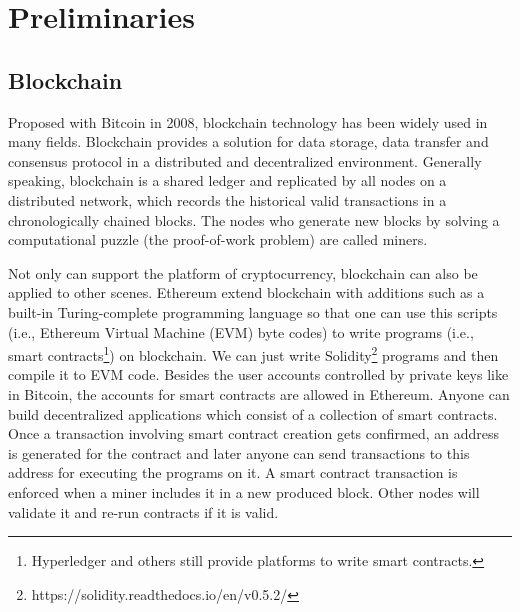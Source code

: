 \documentclass[conference]{IEEEtran}
\begin{document}
\section{Preliminaries}
\label{preli}

	\subsection{Blockchain}
	Proposed with Bitcoin \cite{nakamoto2008bitcoin} in 2008, blockchain technology has been widely used in many fields. Blockchain provides a solution for data storage, data transfer and consensus protocol in a distributed and decentralized environment. Generally speaking, blockchain is a shared ledger and replicated by all nodes on a distributed network, which records the historical valid transactions in a chronologically chained blocks. The nodes who generate new blocks by solving a computational puzzle (the proof-of-work problem) are called miners.
	
	Not only can support the platform of cryptocurrency, blockchain can also be applied to other scenes. Ethereum \cite{wood2014ethereum} extend blockchain with additions such as a built-in Turing-complete programming language so that one can use this scripts (i.e., Ethereum Virtual Machine (EVM) byte codes) to write programs (i.e., smart contracts\footnote{Hyperledger and others still provide platforms to write smart contracts.}) on blockchain. We can just write Solidity\footnote{https://solidity.readthedocs.io/en/v0.5.2/} programs and then compile it to EVM code. Besides the user accounts controlled by private keys like in Bitcoin, the accounts for smart contracts are allowed in Ethereum. Anyone can build decentralized applications which consist of a collection of smart contracts. Once a transaction involving smart contract creation gets confirmed, an address is generated for the contract and later anyone can send transactions to this address for executing the programs on it. A smart contract transaction is enforced when a miner includes it in a new produced block. Other nodes will validate it and re-run contracts if it is valid.
	
\end{document}
